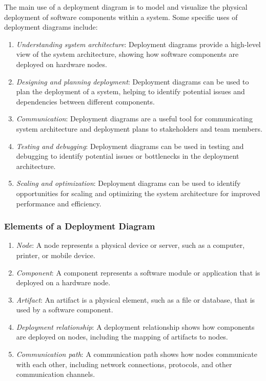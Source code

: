 \documentclass[11pt]{article}
\begin{document}
The main use of a deployment diagram is to model and visualize the physical deployment of software components within a system. Some specific uses of deployment diagrams include:

\begin{enumerate}
	\item \textit{Understanding system architecture}: Deployment diagrams provide a high-level view of the system architecture, showing how software components are deployed on hardware nodes.
	\item \textit{Designing and planning deployment}: Deployment diagrams can be used to plan the deployment of a system, helping to identify potential issues and dependencies between different components.
	\item \textit{Communication}: Deployment diagrams are a useful tool for communicating system architecture and deployment plans to stakeholders and team members.
	\item \textit{Testing and debugging}: Deployment diagrams can be used in testing and debugging to identify potential issues or bottlenecks in the deployment architecture.
	\item \textit{Scaling and optimization}: Deployment diagrams can be used to identify opportunities for scaling and optimizing the system architecture for improved performance and efficiency.

\end{enumerate}

\subsubsection{Elements of a Deployment Diagram}

\begin{enumerate}
	\item \textit{Node}: A node represents a physical device or server, such as a computer, printer, or mobile device.
	\item \textit{Component}: A component represents a software module or application that is deployed on a hardware node.
	\item \textit{Artifact}: An artifact is a physical element, such as a file or database, that is used by a software component.
	\item \textit{Deployment relationship}: A deployment relationship shows how components are deployed on nodes, including the mapping of artifacts to nodes.
	\item \textit{Communication path}: A communication path shows how nodes communicate with each other, including network connections, protocols, and other communication channels.
\end{enumerate}
\end{document}
